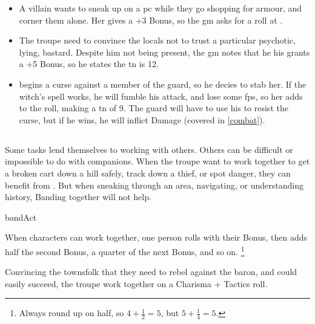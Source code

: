 \begin{multicols}{2}
\begin{itemize}
  \item
    A villain wants to sneak up on a \gls{pc} while they go shopping for armour, and corner them alone.
    Her  gives a +3 Bonus, so the \gls{gm} asks for a  roll at \tn[10].
  \item
    The troupe need to convince the locals not to trust a particular psychotic, lying, bastard.
    Despite him not being present, the \gls{gm} notes that he his  grants a +5 Bonus, so he states the \gls{tn} is 12.
  \item
     begins a curse against a member of the \gls{guard}, so he decies to stab her.
    If the \gls{witch}'s spell works, he will fumble his attack, and lose some \glspl{fp}, so her  adds to the roll, making a \gls{tn} of 9.
    The guard will have to use his  to resist the curse, but if he wins, he will inflict Damage (covered in \autoref{combat}).
\end{itemize}

\subsection{}
\label{teamwork}
\label{banding}

Some tasks lend themselves to working with others.
Others can be difficult or impossible to do with companions.
When the troupe want to work together to get a broken cart down a hill safely, track down a thief, or spot danger, they can benefit from .
But when sneaking through an area, navigating, or understanding history, Banding together will not help.

\gls{bandAct}

When characters can work together, one person rolls with their Bonus, then adds half the second Bonus, a quarter of the next Bonus, and so on.%
\footnote{Always round up on half, so $4 + \frac{1}{2} = 5$, but $5 + \frac{1}{4} = 5$.}

\begin{exampletext}

Convincing the townsfolk that they need to rebel against the baron, and could easily succeed, the troupe work together on a Charisma + Tactics roll.

\end{exampletext}


\end{multicols}
